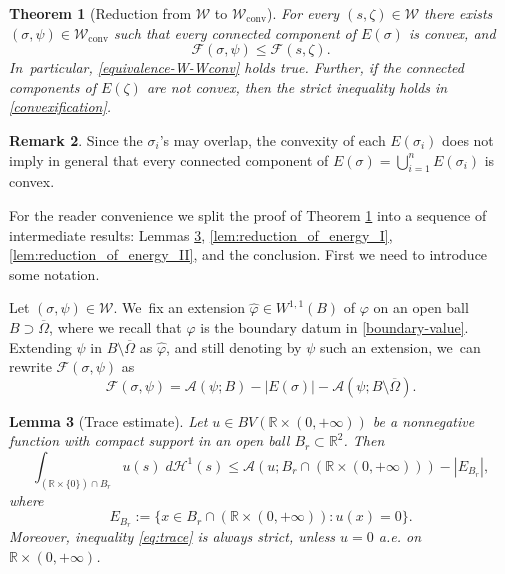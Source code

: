 \documentclass[JEP,XML,SOM,Unicode, NoFloatCountersInSection,published]{cedram}
\newcommand{\R}{\mathbb{R}}
\newcommand{\largercomp}{\mathcal W}
\let\sigmamin\sigma
\let\psimin\psi
\newcommand\admclassconv{{\mathcal W_\mathrm{conv}}}
\newtheorem{theorem}{Theorem}[section]
\newtheorem{lemma}[theorem]{Lemma}
\theoremstyle{definition}
\newtheorem{remark}[theorem]{Remark}
\begin{document}
\begin{theorem}[Reduction from $\largercomp$ to $\admclassconv$]
\label{teo:reduction_from_W_to_Wconv}
For every $(s,\zeta)\in\largercomp$ there exists $(\sigmamin,\psimin)\in\admclassconv$ such that every connected component of $E(\sigmamin)$ is convex, and
\begin{equation}\label{convexification}
{\mathcal{F}}(\sigmamin,\psimin)\le{\mathcal{F}}(s,\zeta).
\end{equation}
In~particular, \eqref{equivalence-W-Wconv} holds true.
Further, if the connected components of $E(\zeta)$ are not convex, then the
strict inequality holds in \eqref{convexification}.
\end{theorem}

\begin{remark}
Since the $\sigma_i$'s may overlap, the convexity of each
$E(\sigma_i)$ does not imply in general that every connected component of $E(\sigma)=\bigcup_{i=1}^nE(\sigma_i)$ is convex.
\end{remark}
For the reader convenience
we split the proof of Theorem \ref{teo:reduction_from_W_to_Wconv}
into a sequence of intermediate results: Lemmas \ref{lem:trace_estimate}, \ref{lem:reduction_of_energy_I}, \ref{lem:reduction_of_energy_II},
and the conclusion.
First we need to introduce some notation.

Let $(\sigma,\psi)\in \largercomp$. We~fix an extension $\widehat \varphi\in W^{1,1}(B)$
of $\varphi$ on an open ball $B\supset\overline\Omega$, where we recall that $\varphi$ is the boundary datum in \eqref{boundary-value}.
Extending $\psi$ in $B \setminus \overline\Omega$ as $\widehat \varphi$,
and still denoting by $\psi$ such an extension, we~can
rewrite $\mathcal F(\sigma,\psi)$ as
\begin{equation}\label{eq:equivalent_forumulation_of_F}
{\mathcal F}(\sigma,\psi)=\mathcal A(\psi;B)-|E(\sigma)|-\mathcal A(\psi;B\setminus \overline\Omega).
\end{equation}

\begin{lemma}[Trace estimate]\label{lem:trace_estimate}
Let $u\in BV(\R\times (0,+\infty))$ be a nonnegative function with compact support in an open ball $B_r\subset\R^2$. Then
\begin{equation}\label{eq:trace}
\int_{(\R\times\{0\})\cap B_r}u(s)\;d\mathcal H^1(s)\leq \mathcal A(u;B_r\cap (\R\times(0,+\infty)))-|E_{B_r}|,
\end{equation}
where
\[
E_{B_r}:=\{x\in B_{r}\cap (\R\times (0,+\infty)):u(x)=0\}.
\]
Moreover, inequality \eqref{eq:trace} is always strict, unless $u=0$ a.e. on $ \R \times (0,+\infty)$.
\end{lemma}
\end{document}
